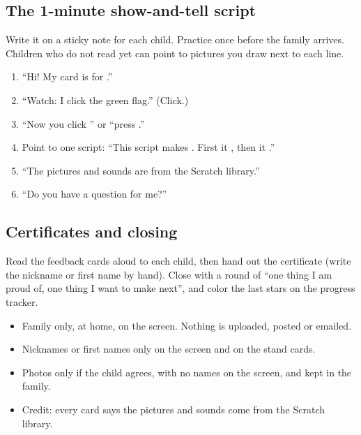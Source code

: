\documentclass[track=junior,level=1,teacher]{kidscode}
\begin{document}
\subsection{The 1-minute show-and-tell script}
Write it on a sticky note for each child. Practice once before the family arrives. Children who do not
read yet can point to pictures you draw next to each line.
\begin{enumerate}[itemsep=2pt]
  \item \enquote{Hi! My card is for \underline{\hspace{3cm}}.}
  \item \enquote{Watch: I click the green flag.} (Click.)
  \item \enquote{Now you click \underline{\hspace{2.5cm}}} or \enquote{press \underline{\hspace{2cm}}.}
  \item Point to one script: \enquote{This script makes \underline{\hspace{3cm}}. First it \underline{\hspace{2.5cm}}, then it \underline{\hspace{2.5cm}}.}
  \item \enquote{The pictures and sounds are from the Scratch library.}
  \item \enquote{Do you have a question for me?}
\end{enumerate}

\subsection{Certificates and closing}
Read the feedback cards aloud to each child, then hand out the certificate (write the nickname or
first name by hand). Close with a round of \enquote{one thing I am proud of, one thing I want to make
next}, and color the last stars on the progress tracker.

\begin{safety}
\begin{itemize}[itemsep=1pt]
  \item Family only, at home, on the screen. Nothing is uploaded, posted or emailed.
  \item Nicknames or first names only on the screen and on the stand cards.
  \item Photos only if the child agrees, with no names on the screen, and kept in the family.
  \item Credit: every card says the pictures and sounds come from the Scratch library.
\end{itemize}
\end{safety}
\end{document}
